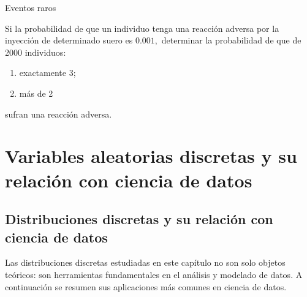


{Eventos raros}
\begin{ejemplo}
\label{exmp:2.10.12}
  Si la probabilidad de que un individuo tenga una reacción adversa por la inyección de determinado suero es $0.001,$ determinar la probabilidad de que de 2000 individuos:
 \begin{enumerate}
  \item exactamente 3;
  \item más de 2
 \end{enumerate}
sufran una reacción adversa.
\end{ejemplo}






\section{Variables aleatorias discretas y su relación con ciencia de datos}
\subsection{Distribuciones discretas y su relación con ciencia de datos}

Las distribuciones discretas estudiadas en este capítulo no son solo objetos teóricos: son herramientas fundamentales en el análisis y modelado de datos. A continuación se resumen sus aplicaciones más comunes en ciencia de datos.

